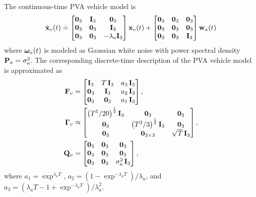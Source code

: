 The continuous-time PVA vehicle model is
\begin{align}
	\dot{\mathbf{x}}_v(t) \doteq 
	\begin{bmatrix}
		\boldsymbol{0}_3 & \mathbf{I}_3 & \boldsymbol{0}_3 \\ \boldsymbol{0}_3 & \boldsymbol{0}_3 & \mathbf{I}_3 \\ \boldsymbol{0}_3 & \boldsymbol{0}_3 & -\lambda_a \mathbf{I}_3
	\end{bmatrix} 
	\mathbf{x}_v(t) +
	\begin{bmatrix} \boldsymbol{0}_3 & \boldsymbol{0}_3 & \boldsymbol{0}_3 \\ \boldsymbol{0}_3 & \boldsymbol{0}_3 & \boldsymbol{0}_3 \\ \boldsymbol{0}_3 & \boldsymbol{0}_3 & \mathbf{I}_3 \end{bmatrix} \mathbf{w}_a(t)
\end{align}
where $\boldsymbol{\omega}_a(t)$ is modeled as Gaussian white noise with power spectral density $\mathbf{P}_a = \sigma^2_a$. 
The corresponding discrete-time description of the PVA vehicle model is approximated as
\begin{align}
	\mathbf{F}_v &= 
	\begin{bmatrix}
		\mathbf{I}_3 & T\,\mathbf{I}_3 & a_3 \, \mathbf{I}_{3} \\
		\boldsymbol{0}_3 & \mathbf{I}_3 & a_2 \, \mathbf{I}_{3} \\
		\boldsymbol{0}_3 & \boldsymbol{0}_3 & a_1 \, \mathbf{I}_{3}
	\end{bmatrix}, ~ \\
	\boldsymbol{\Gamma}_v &\approx
	\begin{bmatrix}
		\big(T^5/20 \big)^{\frac{1}{2}} \, \mathbf{I}_3 & \boldsymbol{0}_3 & \boldsymbol{0}_3\\
		\boldsymbol{0}_3 & \big(T^3 / 3\big)^{\frac{1}{2}} \, \mathbf{I}_3 & \boldsymbol{0}_3 \\
		\boldsymbol{0}_3 & \boldsymbol{0}_{3 \times 3} & \sqrt{T} \, \mathbf{I}_3
	\end{bmatrix}, \\ 
	\mathbf{Q}_{v} &= 
	\begin{bmatrix} \boldsymbol{0}_3 & \boldsymbol{0}_3 & \boldsymbol{0}_3 \\ 
					\boldsymbol{0}_3 & \boldsymbol{0}_3 & \boldsymbol{0}_3 \\
		 			\boldsymbol{0}_3 & \boldsymbol{0}_3 & \sigma^2_a \, \mathbf{I}_3 
	\end{bmatrix},
\end{align}
where $a_1 = \exp^{\lambda_a T}$, $a_2 = (1 - \exp^{-\lambda_a T})/ \lambda_a$, and $a_3 = (\lambda_a T - 1 + \exp^{-\lambda_a T})/ \lambda_a^2$.

